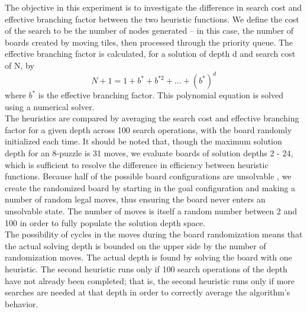 The objective in this experiment is to investigate the difference in search cost and effective branching factor between the two heuristic functions.  We define the cost of the search to be the number of nodes generated -- in this case, the number of boards created by moving tiles, then processed through the priority queue.  The effective branching factor is calculated, for a solution of depth d and search cost of N, by 
$$ N + 1 = 1 + b^* + b^{*2} + ... + (b^*)^d $$
where $b^*$ is the effective branching factor.  This polynomial equation is solved using a numerical solver. \\

The heuristics are compared by averaging the search cost and effective branching factor for a given depth across 100 search operations, with the board randomly initialized each time.  It should be noted that, though the maximum solution depth for an 8-puzzle is 31 moves, we evaluate boards of solution depths 2 - 24, which is sufficient to resolve the difference in efficiency between heuristic functions.  Because half of the possible board configurations are unsolvable \cite{15notes}, we create the randomized board by starting in the goal configuration and making a number of random legal moves, thus ensuring the board never enters an unsolvable state.  The number of moves is itself a random number between 2 and 100 in order to fully populate the solution depth space. \\

The possibility of cycles in the moves during the board randomization means that the actual solving depth is bounded on the upper side by the number of randomization moves.  The actual depth is found by solving the board with one heuristic.  The second heuristic runs only if 100 search operations of the depth have not already been completed; that is, the second heuristic runs only if more searches are needed at that depth in order to correctly average the algorithm's behavior. \\

